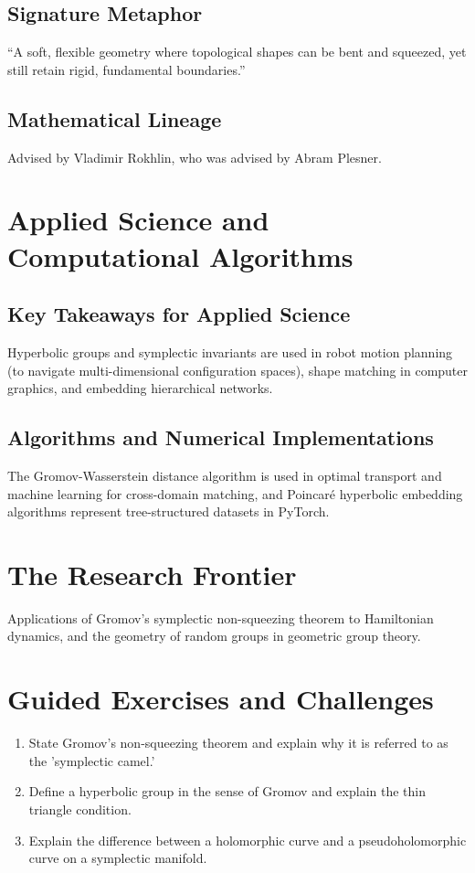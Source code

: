 \subsection{Signature Metaphor}
``A soft, flexible geometry where topological shapes can be bent and squeezed, yet still retain rigid, fundamental boundaries.''

\subsection{Mathematical Lineage}
Advised by Vladimir Rokhlin, who was advised by Abram Plesner.

\section{Applied Science and Computational Algorithms}
\subsection{Key Takeaways for Applied Science}
Hyperbolic groups and symplectic invariants are used in robot motion planning (to navigate multi-dimensional configuration spaces), shape matching in computer graphics, and embedding hierarchical networks.

\subsection{Algorithms and Numerical Implementations}
The Gromov-Wasserstein distance algorithm is used in optimal transport and machine learning for cross-domain matching, and Poincaré hyperbolic embedding algorithms represent tree-structured datasets in PyTorch.

\section{The Research Frontier}
Applications of Gromov's symplectic non-squeezing theorem to Hamiltonian dynamics, and the geometry of random groups in geometric group theory.

\section{Guided Exercises and Challenges}
\begin{enumerate}[label=\textbf{\arabic*.}]
  \item State Gromov's non-squeezing theorem and explain why it is referred to as the 'symplectic camel.'
  \item Define a hyperbolic group in the sense of Gromov and explain the thin triangle condition.
  \item Explain the difference between a holomorphic curve and a pseudoholomorphic curve on a symplectic manifold.
\end{enumerate}


